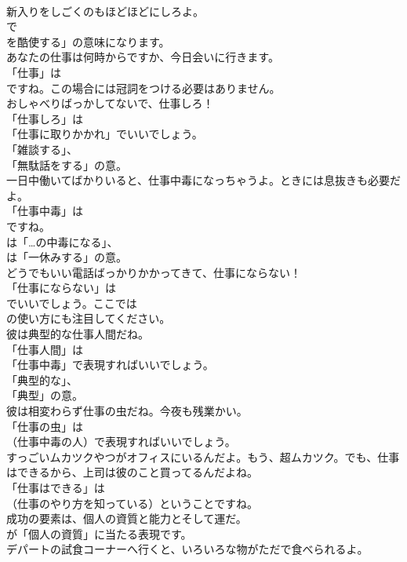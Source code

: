 \documentclass[8pt]{extreport}
\begin{document}
\begin{CJK}{UTF8}{min}
\\	新入りをしごくのもほどほどにしろよ。 
\\	で
\\	を酷使する」の意味になります。	
\\	あなたの仕事は何時からですか、今日会いに行きます。 
\\	「仕事」は
\\	ですね。この場合には冠詞をつける必要はありません。	
\\	おしゃべりばっかしてないで、仕事しろ！ 
\\	「仕事しろ」は
\\	「仕事に取りかかれ」でいいでしょう。
\\	「雑談する」、
\\	「無駄話をする」の意。	
\\	一日中働いてばかりいると、仕事中毒になっちゃうよ。ときには息抜きも必要だよ。 
\\	「仕事中毒」は 
\\	ですね。
\\	は「…の中毒になる」、
\\	は「一休みする」の意。	
\\	どうでもいい電話ばっかりかかってきて、仕事にならない！ 
\\	「仕事にならない」は
\\	でいいでしょう。ここでは
\\	の使い方にも注目してください。	
\\	彼は典型的な仕事人間だね。 
\\	「仕事人間」は
\\	「仕事中毒」で表現すればいいでしょう。
\\	「典型的な」、
\\	「典型」の意。	
\\	彼は相変わらず仕事の虫だね。今夜も残業かい。 
\\	「仕事の虫」は 
\\	（仕事中毒の人）で表現すればいいでしょう。	
\\	すっごいムカツクやつがオフィスにいるんだよ。もう、超ムカツク。でも、仕事はできるから、上司は彼のこと買ってるんだよね。 
\\	「仕事はできる」は 
\\	（仕事のやり方を知っている）ということですね。	
\\	成功の要素は、個人の資質と能力とそして運だ。 
\\	が「個人の資質」に当たる表現です。	
\\	デパートの試食コーナーへ行くと、いろいろな物がただで食べられるよ。 

\end{CJK}
\end{document}
